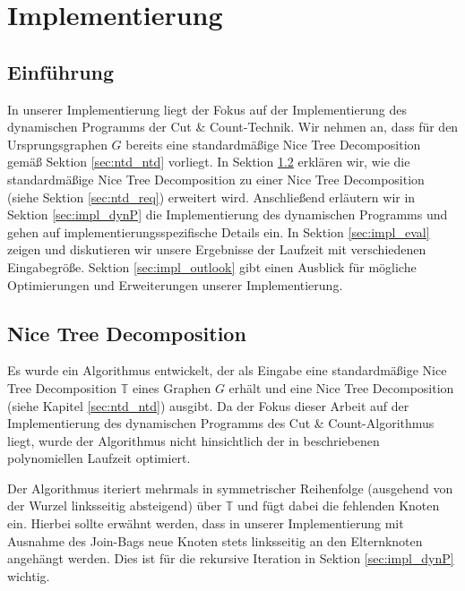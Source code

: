 \chapter{Implementierung}
\label{c:impl}

\section{Einführung}
\label{sec:impl_intro}
In unserer Implementierung liegt der Fokus auf der Implementierung des dynamischen Programms der Cut \& Count-Technik. 
Wir nehmen an, dass für den Ursprungsgraphen $G$ bereits eine standardmäßige Nice Tree Decomposition gemäß Sektion \ref{sec:ntd_ntd} vorliegt. 
In Sektion \ref{sec:impl_ntd} erklären wir, wie die standardmäßige Nice Tree Decomposition zu einer Nice Tree Decomposition (siehe Sektion \ref{sec:ntd_req}) erweitert wird. 
Anschließend erläutern wir in Sektion \ref{sec:impl_dynP} die Implementierung des dynamischen Programms und gehen auf implementierungsspezifische Details ein. 
In Sektion \ref{sec:impl_eval} zeigen und diskutieren wir unsere Ergebnisse der Laufzeit mit verschiedenen Eingabegröße.
Sektion \ref{sec:impl_outlook} gibt einen Ausblick für mögliche Optimierungen und Erweiterungen unserer Implementierung.

\section{Nice Tree Decomposition}
\label{sec:impl_ntd}
Es wurde ein Algorithmus entwickelt, der als Eingabe eine standardmäßige Nice Tree Decomposition $\mathbb{T}$ eines Graphen $G$ erhält und eine Nice Tree Decomposition (siehe Kapitel \ref{sec:ntd_ntd}) ausgibt. 
Da der Fokus dieser Arbeit auf der Implementierung des dynamischen Programms des Cut \& Count-Algorithmus liegt, wurde der Algorithmus nicht hinsichtlich der in \cite{kloks1994} beschriebenen polynomiellen Laufzeit optimiert. 

Der Algorithmus iteriert mehrmals in symmetrischer Reihenfolge (ausgehend von der Wurzel linksseitig absteigend) über $\mathbb{T}$ und fügt dabei die fehlenden Knoten ein. 
Hierbei sollte erwähnt werden, dass in unserer Implementierung mit Ausnahme des \glqq Join\grqq -Bags neue Knoten stets linksseitig an den Elternknoten angehängt werden. 
Dies ist für die rekursive Iteration in Sektion \ref{sec:impl_dynP} wichtig.

